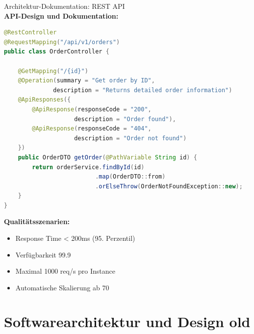 \begin{example2}{Architektur-Dokumentation: REST API}\\
\textbf{API-Design und Dokumentation:}

\begin{lstlisting}[language=Java, style=basesmol]
@RestController
@RequestMapping("/api/v1/orders")
public class OrderController {
    
    @GetMapping("/{id}")
    @Operation(summary = "Get order by ID",
              description = "Returns detailed order information")
    @ApiResponses({
        @ApiResponse(responseCode = "200", 
                    description = "Order found"),
        @ApiResponse(responseCode = "404", 
                    description = "Order not found")
    })
    public OrderDTO getOrder(@PathVariable String id) {
        return orderService.findById(id)
                          .map(OrderDTO::from)
                          .orElseThrow(OrderNotFoundException::new);
    }
}
\end{lstlisting}

\textbf{Qualitätsszenarien:}
\begin{itemize}
    \item Response Time < 200ms (95. Perzentil)
    \item Verfügbarkeit 99.9%
    \item Maximal 1000 req/s pro Instance
    \item Automatische Skalierung ab 70%
\end{itemize}
\end{example2}


\section{Softwarearchitektur und Design old}


